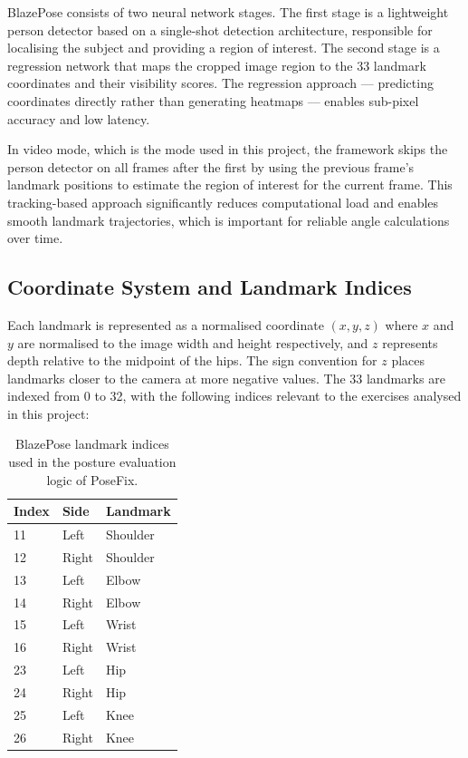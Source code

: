 BlazePose consists of two neural network stages. The first stage is a lightweight person detector based on a single-shot detection architecture, responsible for localising the subject and providing a region of interest. The second stage is a regression network that maps the cropped image region to the 33 landmark coordinates and their visibility scores. The regression approach — predicting coordinates directly rather than generating heatmaps — enables sub-pixel accuracy and low latency.

In video mode, which is the mode used in this project, the framework skips the person detector on all frames after the first by using the previous frame's landmark positions to estimate the region of interest for the current frame. This tracking-based approach significantly reduces computational load and enables smooth landmark trajectories, which is important for reliable angle calculations over time.

\subsection{Coordinate System and Landmark Indices}
\label{subsec:coordinates}

Each landmark is represented as a normalised coordinate $(x, y, z)$ where $x$ and $y$ are normalised to the image width and height respectively, and $z$ represents depth relative to the midpoint of the hips. The sign convention for $z$ places landmarks closer to the camera at more negative values. The 33 landmarks are indexed from 0 to 32, with the following indices relevant to the exercises analysed in this project:

\begin{table}[htbp]
\begin{center}
\begin{tabular}{|p{60pt}|p{60pt}|p{200pt}|}
\hline
\textbf{Index} & \textbf{Side} & \textbf{Landmark} \\
\hline
11 & Left  & Shoulder \\
\hline
12 & Right & Shoulder \\
\hline
13 & Left  & Elbow \\
\hline
14 & Right & Elbow \\
\hline
15 & Left  & Wrist \\
\hline
16 & Right & Wrist \\
\hline
23 & Left  & Hip \\
\hline
24 & Right & Hip \\
\hline
25 & Left  & Knee \\
\hline
26 & Right & Knee \\
\hline
\end{tabular}
\end{center}
\caption{BlazePose landmark indices used in the posture evaluation logic of PoseFix.}
\label{tab:landmarks}
\end{table}

